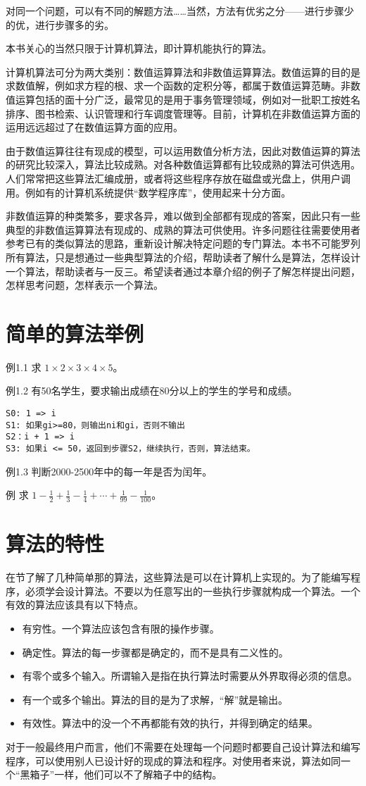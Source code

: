 对同一个问题，可以有不同的解题方法……当然，方法有优劣之分——进行步骤少的优，进行步骤多的劣。

本书关心的当然只限于计算机算法，即计算机能执行的算法。

计算机算法可分为两大类别：数值运算算法和非数值运算算法。数值运算的目的是求数值解，例如求方程的根、求一个函数的定积分等，都属于数值运算范畴。非数值运算包括的面十分广泛，最常见的是用于事务管理领域，例如对一批职工按姓名排序、图书检索、认识管理和行车调度管理等。目前，计算机在非数值运算方面的运用远远超过了在数值运算方面的应用。

由于数值运算往往有现成的模型，可以运用数值分析方法，因此对数值运算的算法的研究比较深入，算法比较成熟。对各种数值运算都有比较成熟的算法可供选用。人们常常把这些算法汇编成册，或者将这些程序存放在磁盘或光盘上，供用户调用。例如有的计算机系统提供“数学程序库”，使用起来十分方面。

非数值运算的种类繁多，要求各异，难以做到全部都有现成的答案，因此只有一些典型的非数值运算算法有现成的、成熟的算法可供使用。许多问题往往需要使用者参考已有的类似算法的思路，重新设计解决特定问题的专门算法。本书不可能罗列所有算法，只是想通过一些典型算法的介绍，帮助读者了解什么是算法，怎样设计一个算法，帮助读者与一反三。希望读者通过本章介绍的例子了解怎样提出问题，怎样思考问题，怎样表示一个算法。

\section{简单的算法举例}

例1.1 求 $1 \times 2 \times 3 \times 4 \times 5$。

例1.2 有50名学生，要求输出成绩在80分以上的学生的学号和成绩。
\begin{lstlisting}
S0: 1 => i
S1: 如果gi>=80，则输出ni和gi，否则不输出
S2：i + 1 => i
S3: 如果i <= 50，返回到步骤S2，继续执行，否则，算法结束。
\end{lstlisting}

例1.3 判断2000-2500年中的每一年是否为闰年。

例 求 $1 - \frac{1}{2} + \frac{1}{3} - \frac{1}{4} + \cdots + \frac{1}{99} - \frac{1}{100}$。
\section{算法的特性}
在节了解了几种简单那的算法，这些算法是可以在计算机上实现的。为了能编写程序，必须学会设计算法。不要以为任意写出的一些执行步骤就构成一个算法。一个有效的算法应该具有以下特点。
\begin{itemize}
	\item 有穷性。一个算法应该包含有限的操作步骤。
	\item 确定性。算法的每一步骤都是确定的，而不是具有二义性的。
	\item 有零个或多个输入。所谓输入是指在执行算法时需要从外界取得必须的信息。
	\item 有一个或多个输出。算法的目的是为了求解，“解”就是输出。
	\item 有效性。算法中的没一个不再都能有效的执行，并得到确定的结果。
\end{itemize}
对于一般最终用户而言，他们不需要在处理每一个问题时都要自己设计算法和编写程序，可以使用别人已设计好的现成的算法和程序。对使用者来说，算法如同一个“黑箱子”一样，他们可以不了解箱子中的结构。


